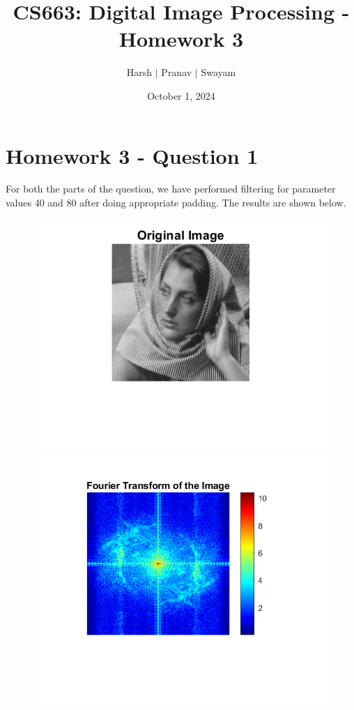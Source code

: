 \documentclass{article}
\title{CS663: Digital Image Processing - Homework 3}
\author{Harsh $\vert$ Pranav $\vert$ Swayam}
\date{October 1, 2024}
\begin{document}
\maketitle
\section{Homework 3 - Question 1}

For both the parts of the question, we have performed filtering for parameter values 40 and 80 after doing appropriate padding. The results are shown below.

\begin{figure}[!htb]
    \centering
    \begin{minipage}[b]{0.45\textwidth}
        \includegraphics[width=\textwidth]{Original_Image.png}
    \end{minipage}
    \begin{minipage}[b]{0.45\textwidth}
        \includegraphics[width=\textwidth]{Fourier_Transform.png}
    \end{minipage}
\end{figure}
\end{document}
